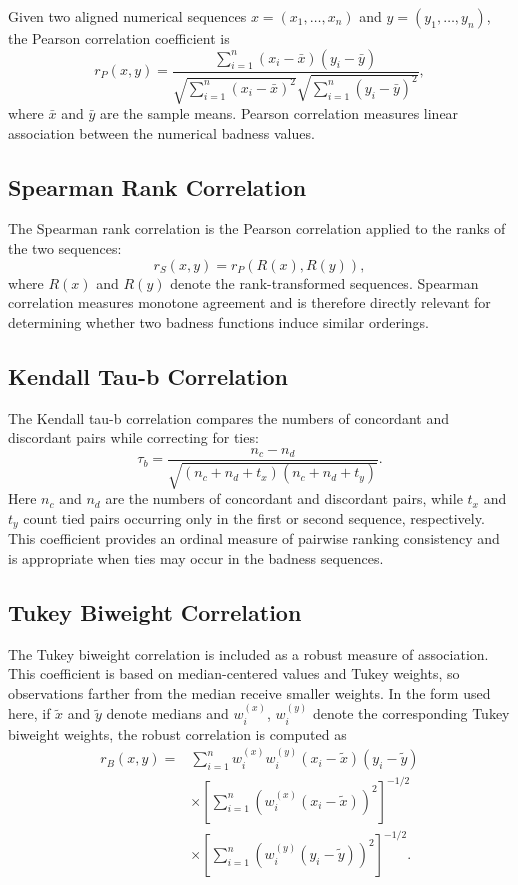 \documentclass[11pt]{article}
\begin{document}
Given two aligned numerical sequences \(x=(x_1,\ldots,x_n)\) and \(y=(y_1,\ldots,y_n)\), the Pearson correlation coefficient is
\[
r_P(x,y)
=
\frac{\sum_{i=1}^{n}(x_i-\bar{x})(y_i-\bar{y})}
{\sqrt{\sum_{i=1}^{n}(x_i-\bar{x})^2}\sqrt{\sum_{i=1}^{n}(y_i-\bar{y})^2}},
\]
where \(\bar{x}\) and \(\bar{y}\) are the sample means. Pearson correlation measures linear association between the numerical badness values.

\subsection{Spearman Rank Correlation}

The Spearman rank correlation is the Pearson correlation applied to the ranks of the two sequences:
\[
r_S(x,y)=r_P(R(x),R(y)),
\]
where \(R(x)\) and \(R(y)\) denote the rank-transformed sequences. Spearman correlation measures monotone agreement and is therefore directly relevant for determining whether two badness functions induce similar orderings.

\subsection{Kendall Tau-b Correlation}

The Kendall tau-b correlation compares the numbers of concordant and discordant pairs while correcting for ties:
\[
\tau_b
=
\frac{n_c-n_d}
{\sqrt{(n_c+n_d+t_x)(n_c+n_d+t_y)}}.
\]
Here \(n_c\) and \(n_d\) are the numbers of concordant and discordant pairs, while \(t_x\) and \(t_y\) count tied pairs occurring only in the first or second sequence, respectively. This coefficient provides an ordinal measure of pairwise ranking consistency and is appropriate when ties may occur in the badness sequences.

\subsection{Tukey Biweight Correlation}

The Tukey biweight correlation is included as a robust measure of association. This coefficient is based on median-centered values and Tukey weights, so observations farther from the median receive smaller weights. In the form used here, if \(\tilde{x}\) and \(\tilde{y}\) denote medians and \(w_i^{(x)}\), \(w_i^{(y)}\) denote the corresponding Tukey biweight weights, the robust correlation is computed as
\[
\begin{aligned}
r_B(x,y)
={}&
\sum_{i=1}^{n}
w_i^{(x)}w_i^{(y)}
(x_i-\tilde{x})(y_i-\tilde{y})
\\
&\times
\left[
\sum_{i=1}^{n}
\left(w_i^{(x)}(x_i-\tilde{x})\right)^2
\right]^{-1/2}
\\
&\times
\left[
\sum_{i=1}^{n}
\left(w_i^{(y)}(y_i-\tilde{y})\right)^2
\right]^{-1/2}.
\end{aligned}
\]
\end{document}
